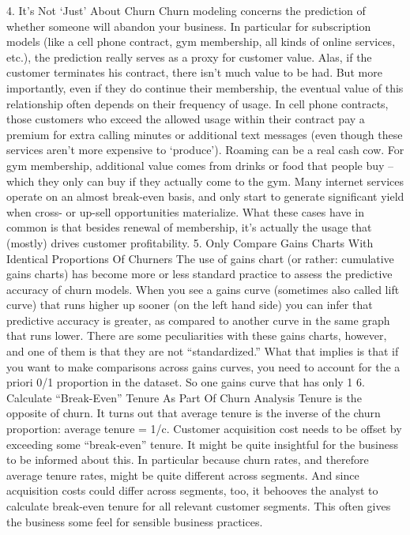 4. It’s Not ‘Just’ About Churn
Churn modeling concerns the prediction of whether someone will abandon your business. In particular for subscription models (like a cell phone contract, gym membership, all kinds of online services, etc.), the prediction really serves as a proxy for customer value. Alas, if the customer terminates his contract, there isn’t much value to be had. But more importantly, even if they do continue their membership, the eventual value of this relationship often depends on their frequency of usage.
In cell phone contracts, those customers who exceed the allowed usage within their contract pay a premium for extra calling minutes or additional text messages (even though these services aren’t more expensive to ‘produce’). Roaming can be a real cash cow. For gym membership, additional value comes from drinks or food that people buy – which they only can buy if they actually come to the gym. Many internet services operate on an almost break-even basis, and only start to generate significant yield when cross- or up-sell opportunities materialize. What these cases have in common is that besides renewal of membership, it’s actually the usage that (mostly) drives customer profitability.
5. Only Compare Gains Charts With Identical Proportions Of Churners
The use of gains chart (or rather: cumulative gains charts) has become more or less standard practice to assess the predictive accuracy of churn models. When you see a gains curve (sometimes also called lift curve) that runs higher up sooner (on the left hand side) you can infer that predictive accuracy is greater, as compared to another curve in the same graph that runs lower.
There are some peculiarities with these gains charts, however, and one of them is that they are not “standardized.” What that implies is that if you want to make comparisons across gains curves, you need to account for the a priori 0/1 proportion in the dataset. So one gains curve that has only 1%
6. Calculate “Break-Even” Tenure As Part Of Churn Analysis
Tenure is the opposite of churn. It turns out that average tenure is the inverse of the churn proportion: average tenure = 1/c. Customer acquisition cost needs to be offset by exceeding some “break-even” tenure. It might be quite insightful for the business to be informed about this. In particular because churn rates, and therefore average tenure rates, might be quite different across segments. And since acquisition costs could differ across segments, too, it behooves the analyst to calculate break-even tenure for all relevant customer segments. This often gives the business some feel for sensible business practices.
